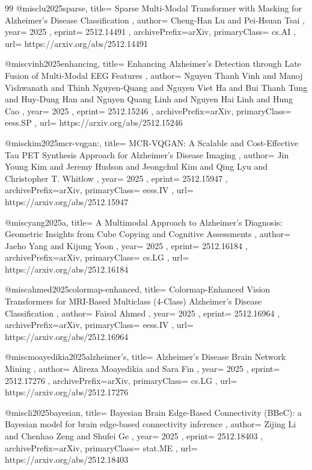 \documentclass[11pt,a4paper]{article}
\begin{document}
\begin{thebibliography}{99}
@misc{lu2025sparse,
  title={ Sparse Multi-Modal Transformer with Masking for Alzheimer's Disease Classification },
  author={ Cheng-Han Lu and Pei-Hsuan Tsai },
  year={ 2025 },
  eprint={ 2512.14491 },
  archivePrefix={arXiv},
  primaryClass={ cs.AI },
  url={ https://arxiv.org/abs/2512.14491 }
}


@misc{vinh2025enhancing,
  title={ Enhancing Alzheimer's Detection through Late Fusion of Multi-Modal EEG Features },
  author={ Nguyen Thanh Vinh and Manoj Vishwanath and Thinh Nguyen-Quang and Nguyen Viet Ha and Bui Thanh Tung and Huy-Dung Han and Nguyen Quang Linh and Nguyen Hai Linh and Hung Cao },
  year={ 2025 },
  eprint={ 2512.15246 },
  archivePrefix={arXiv},
  primaryClass={ eess.SP },
  url={ https://arxiv.org/abs/2512.15246 }
}


@misc{kim2025mcr-vqgan:,
  title={ MCR-VQGAN: A Scalable and Cost-Effective Tau PET Synthesis Approach for Alzheimer's Disease Imaging },
  author={ Jin Young Kim and Jeremy Hudson and Jeongchul Kim and Qing Lyu and Christopher T. Whitlow },
  year={ 2025 },
  eprint={ 2512.15947 },
  archivePrefix={arXiv},
  primaryClass={ eess.IV },
  url={ https://arxiv.org/abs/2512.15947 }
}


@misc{yang2025a,
  title={ A Multimodal Approach to Alzheimer's Diagnosis: Geometric Insights from Cube Copying and Cognitive Assessments },
  author={ Jaeho Yang and Kijung Yoon },
  year={ 2025 },
  eprint={ 2512.16184 },
  archivePrefix={arXiv},
  primaryClass={ cs.LG },
  url={ https://arxiv.org/abs/2512.16184 }
}


@misc{ahmed2025colormap-enhanced,
  title={ Colormap-Enhanced Vision Transformers for MRI-Based Multiclass (4-Class) Alzheimer's Disease Classification },
  author={ Faisal Ahmed },
  year={ 2025 },
  eprint={ 2512.16964 },
  archivePrefix={arXiv},
  primaryClass={ eess.IV },
  url={ https://arxiv.org/abs/2512.16964 }
}


@misc{moayedikia2025alzheimer's,
  title={ Alzheimer's Disease Brain Network Mining },
  author={ Alireza Moayedikia and Sara Fin },
  year={ 2025 },
  eprint={ 2512.17276 },
  archivePrefix={arXiv},
  primaryClass={ cs.LG },
  url={ https://arxiv.org/abs/2512.17276 }
}


@misc{li2025bayesian,
  title={ Bayesian Brain Edge-Based Connectivity (BBeC): a Bayesian model for brain edge-based connectivity inference },
  author={ Zijing Li and Chenhao Zeng and Shufei Ge },
  year={ 2025 },
  eprint={ 2512.18403 },
  archivePrefix={arXiv},
  primaryClass={ stat.ME },
  url={ https://arxiv.org/abs/2512.18403 }
}



\end{thebibliography}
\end{document}

